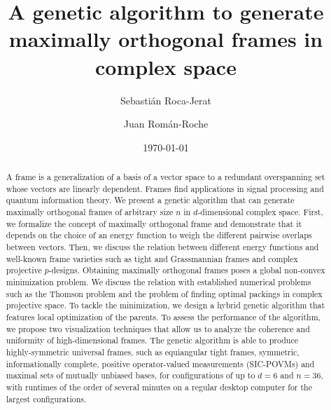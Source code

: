 \documentclass[%
superscriptaddress,
amsmath,amssymb,
 aps,
pra,
floatfix,
]{revtex4-2}
\begin{document}
\title{
A genetic algorithm to generate maximally orthogonal frames in complex space
}



\author{Sebastián Roca-Jerat}

\author{Juan Román-Roche}
  
\date{\today}

\begin{abstract}


A frame is a generalization of a basis of a vector space to a redundant overspanning set whose vectors are linearly dependent. Frames find applications in signal processing and quantum information theory. We present a genetic algorithm that can generate maximally orthogonal frames of arbitrary size $n$ in $d$-dimensional complex space.
First, we formalize the concept of maximally orthogonal frame and demonstrate that it depends on the choice of an energy function to weigh the different pairwise overlaps between vectors. 
Then, we discuss the relation between different energy functions and well-known frame varieties such as tight and Grassmannian frames and complex projective $p$-designs. Obtaining maximally orthogonal frames poses a global non-convex minimization problem. We discuss the relation with established numerical problems such as the Thomson problem and the problem of finding optimal packings in complex projective space. To tackle the minimization, we design a hybrid genetic algorithm that features local optimization of the parents. To assess the performance of the algorithm, we propose two visualization techniques that allow us to analyze the coherence and uniformity of high-dimensional frames. The genetic algorithm is able to produce highly-symmetric universal frames, such as equiangular tight frames, symmetric, informationally complete, positive operator-valued measurements (SIC-POVMs) and maximal sets of mutually unbiased bases, for configurations of up to $d=6$ and $n=36$, with runtimes of the order of several minutes on a regular desktop computer for the largest configurations.


\end{abstract}
\end{document}
